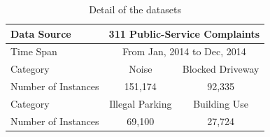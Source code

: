 \begin{table}
\begin{tabular}{l|c|c|c|c|c|c|}
\toprule
\textbf{Data Source} &\multicolumn{6}{|c}{\textbf{311 Public-Service Complaints}}\\[0.1cm]
\hline
\hline
Time Span &\multicolumn{6}{|c}{From Jan, 2014 to Dec, 2014}  \\[0.1cm]
\hline
Category &\multicolumn{3}{|c|}{Noise}  &\multicolumn{3}{|c}{Blocked Driveway}\\[0.1cm]
\hline
Number of Instances &\multicolumn{3}{|c|}{151,174} &\multicolumn{3}{|c}{92,335}\\[0.1cm]
\hline
Category &\multicolumn{3}{|c|}{Illegal Parking}  &\multicolumn{3}{|c}{Building Use}\\[0.1cm]
\hline  
Number of Instances &\multicolumn{3}{|c|}{69,100} &\multicolumn{3}{|c}{27,724}\\[0.1cm]
\bottomrule

\end{tabular}
\vspace{0.2cm}
\caption{Detail of the datasets}
\label{table:dataset}
\end{table}

